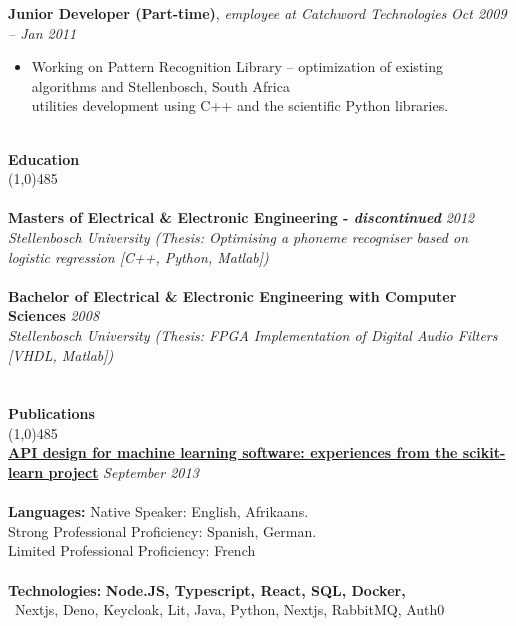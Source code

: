 \documentclass[9pt]{extarticle}
\newcommand\tab[1][1cm]{\hspace*{#1}}
\newcommand\smallspace[1][0.23cm]{\hspace*{#1}}
\newcommand\negativespace[1][-0.12cm]{\hspace*{#1}}
\begin{document}
\noindent
{\bf Junior Developer (Part-time)}, \textit{employee at Catchword Technologies}  \hfill \textit{Oct 2009 -- Jan 2011}
\begin{itemize}
\setlength\itemsep{0.05em}

\item Working on Pattern Recognition Library – optimization of existing algorithms and \hfill Stellenbosch, South Africa \\
utilities development using C++ and the scientific Python libraries.

\end{itemize}

\noindent %
\\
\vspace*{-6pt}
{\negativespace \Large \bf Education}\\
\line(1,0){485}\\
\\
\noindent
{\bf Masters of Electrical & Electronic Engineering - \textit{discontinued}} \hfill \textit{2012} \\
\textit{Stellenbosch University (Thesis: Optimising a phoneme recogniser based on logistic regression [C++, Python, Matlab])} \\\\
\noindent
{\bf Bachelor of Electrical & Electronic Engineering with Computer Sciences} \hfill \textit{2008} \\
\textit{Stellenbosch University (Thesis: FPGA Implementation of Digital Audio Filters [VHDL, Matlab])} \\
\\
\\
\vspace*{-6pt}
{\negativespace \Large \bf Publications}\\
\line(1,0){485}\\
{\bf \href{https://paperswithcode.com/paper/api-design-for-machine-learning-software}{API design for machine learning software: experiences from the scikit-learn project}} \hfill \textit{September 2013} \\
\\

\noindent
{\bf Languages:} \smallspace Native Speaker: English, Afrikaans. \\
\tab \tab Strong Professional Proficiency: Spanish, German. \\
\tab \tab Limited Professional Proficiency: French \\ \\
\noindent
{\bf Technologies:} \textbf{Node.JS, Typescript, React, SQL, Docker,}\\
\tab \tab\ Nextjs, Deno, Keycloak, Lit, Java, Python, Nextjs, RabbitMQ, Auth0
\end{document}
